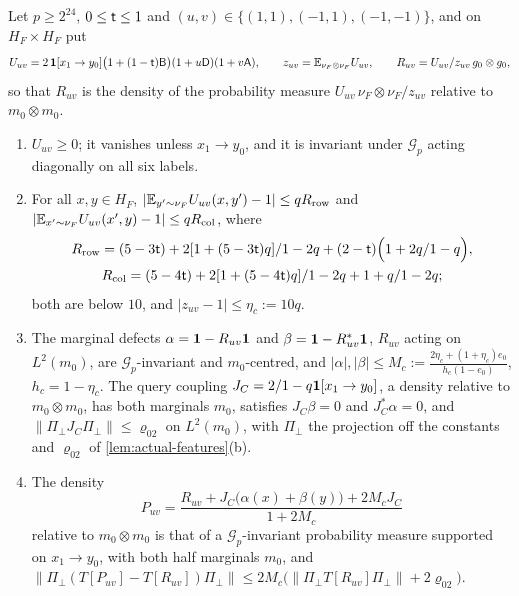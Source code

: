 \begin{lemma}
\label{lem:signed-components}
Let $p\ge2^{24}$, $0\le\mathsf t\le1$ and $(u,v)\in\{(1,1),(-1,1),(-1,-1)\}$, and on
$H_F\times H_F$ put
\[
 U_{uv}=2\,\mathbf 1[x_1\to y_0]\bigl(1+(1-\mathsf t)\mathsf B\bigr)(1+u\mathsf D)(1+v\mathsf A),
 \qquad z_{uv}=\mathbb E_{\nu_F\otimes\nu_F}U_{uv},\qquad
 R_{uv}=U_{uv}/z_{uv}\,g_0\otimes g_0,
\]
so that $R_{uv}$ is the density of the probability measure
$U_{uv}\,\nu_F\otimes\nu_F/z_{uv}$ relative to $m_0\otimes m_0$.
\begin{enumerate}[label=(\alph*)]
\item $U_{uv}\ge0$; it vanishes unless $x_1\to y_0$, and it is invariant under
 $\mathcal G_p$ acting diagonally on all six labels.
\item For all $x,y\in H_F$,
 $|\mathbb E_{y'\sim\nu_F}U_{uv}(x,y')-1|\le qR_{\rm row}$ and
 $|\mathbb E_{x'\sim\nu_F}U_{uv}(x',y)-1|\le qR_{\rm col}$, where
 \begin{gather*}
  R_{\rm row}=(5-3\mathsf t)+2[1+(5-3\mathsf t)q]/1-2q
  +(2-\mathsf t)\Bigl(1+2q/1-q\Bigr),\\
  R_{\rm col}=(5-4\mathsf t)+2[1+(5-4\mathsf t)q]/1-2q+1+q/1-2q;
 \end{gather*}
 both are below $10$, and $|z_{uv}-1|\le\eta_c:=10q$.
\item The marginal defects $\alpha=\mathbf 1-R_{uv}\mathbf 1$ and $\beta=\mathbf 1-R_{uv}^*\mathbf 1$,
 $R_{uv}$ acting on $L^2(m_0)$, are $\mathcal G_p$-invariant and $m_0$-centred, and
 $|\alpha|,|\beta|\le M_c:=\frac{2\eta_c+(1+\eta_c)e_0}{h_c(1-e_0)}$, $h_c=1-\eta_c$.
 The query coupling $J_C=2/1-q\mathbf 1[x_1\to y_0]$, a density relative to
 $m_0\otimes m_0$, has both marginals $m_0$, satisfies $J_C\beta=0$ and
 $J_C^*\alpha=0$, and $\|\Pi_\perp J_C\Pi_\perp\|\le\varrho_{02}$ on $L^2(m_0)$, with
 $\Pi_\perp$ the projection off the constants and $\varrho_{02}$ of
 \cref{lem:actual-features}(b).
\item The density
 \[
  P_{uv}=\frac{R_{uv}+J_C\bigl(\alpha(x)+\beta(y)\bigr)+2M_cJ_C}{1+2M_c}
 \]
 relative to $m_0\otimes m_0$ is that of a $\mathcal G_p$-invariant probability
 measure supported on $x_1\to y_0$, with both half marginals $m_0$, and
 $\|\Pi_\perp(T[P_{uv}]-T[R_{uv}])\Pi_\perp\|\le2M_c\bigl(\|\Pi_\perp T[R_{uv}]\Pi_\perp\|
 +2\varrho_{02}\bigr)$.
\end{enumerate}
\end{lemma}

